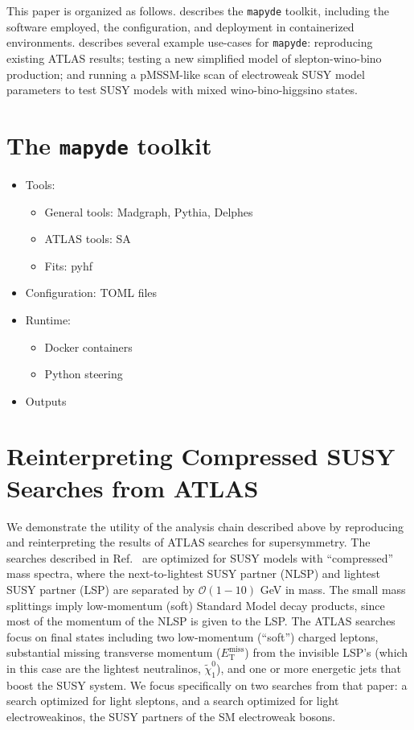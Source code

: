 \documentclass{article}
\newcommand{\chioz}{\ensuremath{\widetilde{\chi}_{1}^{0}}}
\newcommand{\met}{\ensuremath{E_{\mathrm{T}}^{\mathrm{miss}}}}
\newcommand{\mapyde}{\texttt{mapyde}}
\begin{document}
This paper is organized as follows.  describes the \mapyde{} toolkit, including the software employed, the configuration, and deployment in containerized environments.   describes several example use-cases for \mapyde: reproducing existing ATLAS results; testing a new simplified model of slepton-wino-bino production; and running a pMSSM-like scan of electroweak SUSY model parameters to test SUSY models with mixed wino-bino-higgsino states.

\section{The \mapyde{} toolkit}
\label{sec:the-toolkit}

\begin{itemize}
	\item Tools:
	      \begin{itemize}
		      \item General tools: Madgraph, Pythia, Delphes
		      \item ATLAS tools: SA
		      \item Fits: pyhf
	      \end{itemize}
	\item Configuration: TOML files
	\item Runtime:
	      \begin{itemize}
		      \item Docker containers
		      \item Python steering
	      \end{itemize}
	\item Outputs
\end{itemize}

\section{Reinterpreting Compressed SUSY Searches from ATLAS}
\label{sec:reinterpreting-compressed-susy-searches-from-atlas}

We demonstrate the utility of the analysis chain described above by reproducing and reinterpreting the results of ATLAS searches for supersymmetry.  The searches described in Ref.~\cite{ATLAS:2019lng} are optimized for SUSY models with \enquote{compressed} mass spectra, where the next-to-lightest SUSY partner (NLSP) and lightest SUSY partner (LSP) are separated by $\mathcal{O}(1-10)$ GeV in mass.  The small mass splittings imply low-momentum (soft) Standard Model decay products, since most of the momentum of the NLSP is given to the LSP.  The ATLAS searches focus on final states including two low-momentum (\enquote{soft}) charged leptons, substantial missing transverse momentum (\met) from the invisible LSP's (which in this case are the lightest neutralinos, \chioz), and one or more energetic jets that boost the SUSY system.  We focus specifically on two searches from that paper: a search optimized for light sleptons, and a search optimized for light electroweakinos, the SUSY partners of the SM electroweak bosons.
\end{document}
